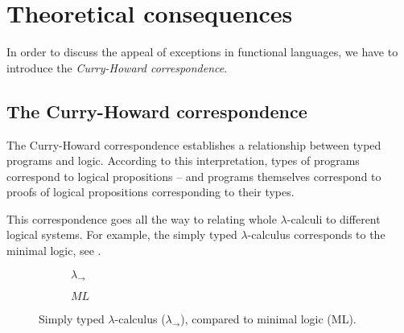 
\section{Theoretical consequences}

In order to discuss the appeal of exceptions in functional languages, we have to introduce
the \emph{Curry-Howard correspondence}.

\subsection{The Curry-Howard correspondence}

The Curry-Howard correspondence establishes a relationship between typed programs and logic.
According to this interpretation, types of programs correspond to logical propositions --
and programs themselves correspond to proofs of logical propositions corresponding to their
types.

This correspondence goes all the way to relating whole $\lambda$-calculi to different
logical systems. For example, the simply typed $\lambda$-calculus corresponds to the minimal
logic, see .

\begin{figure}
\centering
\begin{subfigure}[b]{0.45\textwidth}
\begin{prooftree}
\end{prooftree}
\begin{prooftree}
\end{prooftree}
\begin{prooftree}
\end{prooftree}

\caption{$\lambda_\to$}
\end{subfigure}
%
\begin{subfigure}[b]{0.45\textwidth}
\begin{prooftree}
\end{prooftree}
\begin{prooftree}
\end{prooftree}
\begin{prooftree}
\end{prooftree}
\caption{$ML$}
\end{subfigure}

\caption{Simply typed $\lambda$-calculus ($\lambda_\to$), compared to minimal logic (ML).}
\label{fig:stlc-ml}
\end{figure}

